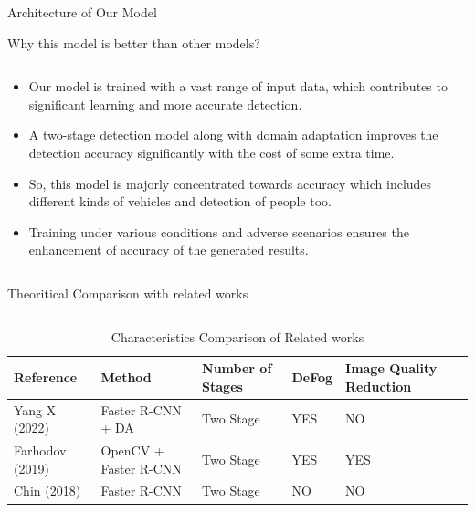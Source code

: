 \documentclass[10pt,aspectratio=169,t]{beamer}
\begin{document}
\begin{frame}[allowframebreaks]{Architecture of Our Model}
\newpage

\begin{block}{Why this model is better than other models?}
\end{block}
\begin{columns}
\begin{column}{1\textwidth}
\vspace{-0.5cm}
\begin{itemize}
\justifying
\item  Our model is trained with a vast range of input data, which contributes to significant learning and more accurate detection.
\item A two-stage detection model along with domain adaptation improves the detection accuracy significantly with the cost of some extra time.
\item So, this model is majorly concentrated towards accuracy which includes different kinds of vehicles and detection of people too.
\item Training under various conditions and adverse scenarios ensures the enhancement of accuracy of the generated results.
\end{itemize}
\end{column}
\end{columns}


\newpage
\begin{block}{Theoritical Comparison with related works}
\end{block}
\begin{columns}
\begin{column}{1\textwidth}
\vspace{-0.5cm}
\begin{table}
\caption{Characteristics Comparison of Related works}\label{Table 1}
\centering
\begin{tabular}{ 
|p{2cm}|p{2.6cm}|p{1.9cm}|p{1cm}|p{2.3cm}|p{2.3cm}| }
 \hline
 \textbf{Reference} & \textbf{Method} & \textbf{Number of Stages} & \textbf{DeFog} & \textbf{Image Quality Reduction}  \\
 \hline
Yang X (2022) \cite{n2} & Faster R-CNN + DA  & Two Stage & YES & NO \\ \hline
Farhodov (2019) \cite{n4} & OpenCV + Faster R-CNN & Two Stage & YES & YES \\ \hline
Chin (2018) \cite{n5} & Faster R-CNN & Two Stage & NO & NO \\ \hline
\end{tabular}
\end{table}
\end{column}
\end{columns}



\end{frame}
\end{document}
